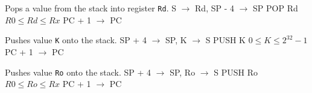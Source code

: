 \documentclass[titlepage]{scrartcl}
\begin{document}
{Pops a value from the stack into register \texttt{Rd}.}
{S $\rightarrow$ Rd, SP - 4 $\rightarrow$ SP}
{POP Rd}
{$R0 \leq Rd \leq Rx$}
{PC + 1 $\rightarrow$ PC}
{}
{\srtable{}{}{}{}}

{Pushes value \texttt{K} onto the stack.}
{SP + 4 $\rightarrow$ SP, K $\rightarrow$ S}
{PUSH K}
{$0 \leq K \leq 2^{32} - 1$}
{PC + 1 $\rightarrow$ PC}
{}
{\srtable{}{}{}{}}

{Pushes value \texttt{Ro} onto the stack.}
{SP + 4 $\rightarrow$ SP, Ro $\rightarrow$ S}
{PUSH Ro}
{$R0 \leq Ro \leq Rx$}
{PC + 1 $\rightarrow$ PC}
{}
{\srtable{}{}{}{}}

\end{document}
